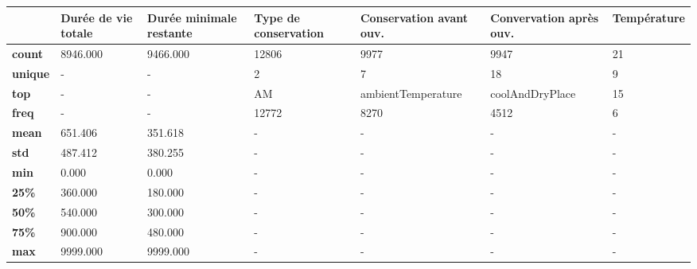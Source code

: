 \begin{tabularx}{\linewidth}{lXXXXXX}
\toprule
{} &  Durée de vie totale &  Durée minimale restante & Type de conservation & Conservation avant ouv. & Convervation après ouv. & Température \\
\midrule
\textbf{count } &             8946.000 &                 9466.000 &                12806 &                    9977 &                    9947 &          21 \\
\textbf{unique} &                    - &                        - &                    2 &                       7 &                      18 &           9 \\
\textbf{top   } &                    - &                        - &                   AM &      ambientTemperature &         coolAndDryPlace &          15 \\
\textbf{freq  } &                    - &                        - &                12772 &                    8270 &                    4512 &           6 \\
\textbf{mean  } &              651.406 &                  351.618 &                    - &                       - &                       - &           - \\
\textbf{std   } &              487.412 &                  380.255 &                    - &                       - &                       - &           - \\
\textbf{min   } &                0.000 &                    0.000 &                    - &                       - &                       - &           - \\
\textbf{25\%   } &              360.000 &                  180.000 &                    - &                       - &                       - &           - \\
\textbf{50\%   } &              540.000 &                  300.000 &                    - &                       - &                       - &           - \\
\textbf{75\%   } &              900.000 &                  480.000 &                    - &                       - &                       - &           - \\
\textbf{max   } &             9999.000 &                 9999.000 &                    - &                       - &                       - &           - \\
\bottomrule
\end{tabularx}
